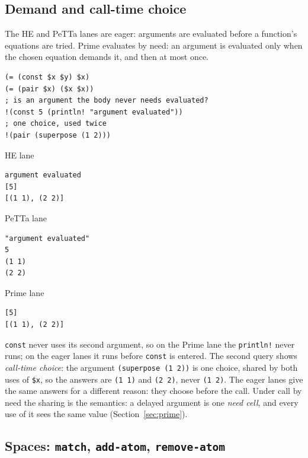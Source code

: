 \documentclass[11pt]{article}
\newcommand{\code}[1]{\texttt{#1}}
\newcommand{\outhead}[1]{{\footnotesize\sffamily #1}\par\vspace{1pt}}
\newcommand{\PeTTa}{\textup{PeTTa}}
\newcommand{\HE}{\textup{HE}}
\begin{document}
\subsection{Demand and call-time choice}
\label{sec:tut-demand}

The \HE{} and \PeTTa{} lanes are eager: arguments are evaluated before a
function's equations are tried.  Prime evaluates by need: an argument is
evaluated only when the chosen equation demands it, and then at most once.

\begin{lstlisting}[style=metta,caption={Demand and call-time choice},label={lst:t03}]
(= (const $x $y) $x)
(= (pair $x) ($x $x))
; is an argument the body never needs evaluated?
!(const 5 (println! "argument evaluated"))
; one choice, used twice
!(pair (superpose (1 2)))
\end{lstlisting}
\noindent\begin{minipage}[t]{0.32\textwidth}
\outhead{HE lane}
\begin{lstlisting}[style=out]
argument evaluated
[5]
[(1 1), (2 2)]
\end{lstlisting}
\end{minipage}\hfill
\begin{minipage}[t]{0.32\textwidth}
\outhead{PeTTa lane}
\begin{lstlisting}[style=out]
"argument evaluated"
5
(1 1)
(2 2)
\end{lstlisting}
\end{minipage}\hfill
\begin{minipage}[t]{0.32\textwidth}
\outhead{Prime lane}
\begin{lstlisting}[style=out]
[5]
[(1 1), (2 2)]
\end{lstlisting}
\end{minipage}

\noindent
\code{const} never uses its second argument, so on the Prime lane the
\code{println!} never runs; on the eager lanes it runs before \code{const} is
entered.  The second query shows \emph{call-time choice}: the argument
\code{(superpose (1 2))} is one choice, shared by both uses of \code{\$x}, so
the answers are \code{(1 1)} and \code{(2 2)}, never \code{(1 2)}.  The eager
lanes give the same answers for a different reason: they choose before the
call.  Under call by need the sharing is the semantics: a delayed argument is
one \emph{need cell}, and every use of it sees the same value
(Section~\ref{sec:prime}).

\subsection{Spaces: \code{match}, \code{add-atom}, \code{remove-atom}}
\label{sec:tut-spaces}
\end{document}
